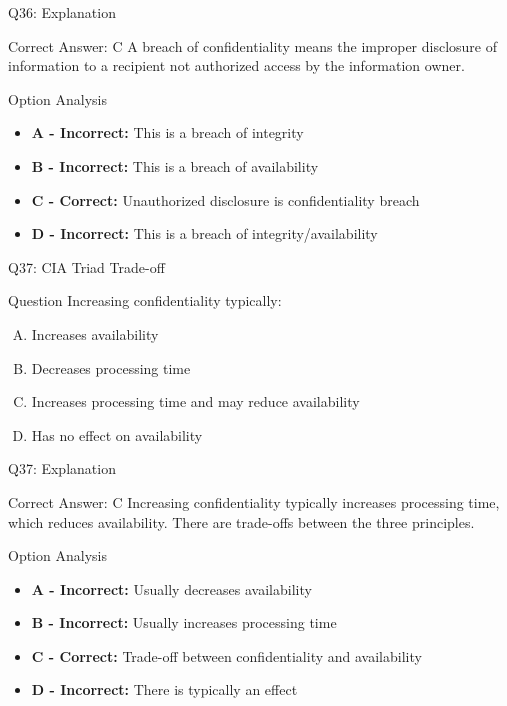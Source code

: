 \documentclass{beamer}
\begin{document}
	\begin{frame}{Q36: Explanation}
		\begin{block}{Correct Answer: C}
			A breach of confidentiality means the improper disclosure of information to a recipient not authorized access by the information owner.
		\end{block}
		\begin{block}{Option Analysis}
			\begin{itemize}
				\item \textbf{A - Incorrect:} This is a breach of integrity
				\item \textbf{B - Incorrect:} This is a breach of availability
				\item \textbf{C - Correct:} Unauthorized disclosure is confidentiality breach
				\item \textbf{D - Incorrect:} This is a breach of integrity/availability
			\end{itemize}
		\end{block}
	\end{frame}
	
	\begin{frame}{Q37: CIA Triad Trade-off}
		\begin{block}{Question}
			Increasing confidentiality typically:
		\end{block}
		\begin{enumerate}[(A)]
			\item Increases availability
			\item Decreases processing time
			\item Increases processing time and may reduce availability
			\item Has no effect on availability
		\end{enumerate}
	\end{frame}
	
	\begin{frame}{Q37: Explanation}
		\begin{block}{Correct Answer: C}
			Increasing confidentiality typically increases processing time, which reduces availability. There are trade-offs between the three principles.
		\end{block}
		\begin{block}{Option Analysis}
			\begin{itemize}
				\item \textbf{A - Incorrect:} Usually decreases availability
				\item \textbf{B - Incorrect:} Usually increases processing time
				\item \textbf{C - Correct:} Trade-off between confidentiality and availability
				\item \textbf{D - Incorrect:} There is typically an effect
			\end{itemize}
		\end{block}
	\end{frame}
	
\end{document}
